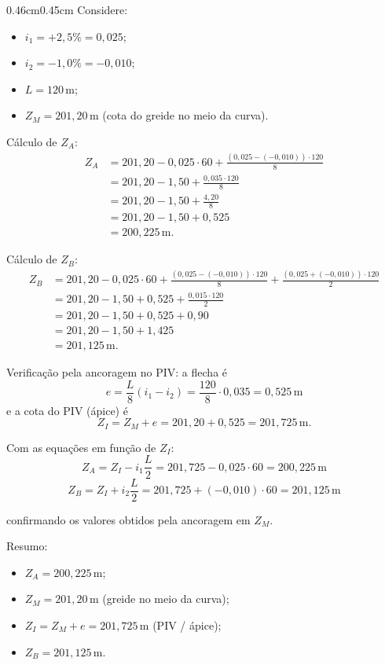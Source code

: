 \documentclass[12pt,letterpaper]{article}
\newenvironment{corpo}{\begin{adjustwidth}{0.46cm}{0.45cm}\justifying}{\end{adjustwidth}}
\begin{document}
\begin{corpo}
Considere:
\begin{itemize}
    \item $i_1=+2{,}5\%=0{,}025$;
    \item $i_2=-1{,}0\%=-0{,}010$;
    \item $L=120\,\text{m}$;
    \item $Z_M=201{,}20\,\text{m}$ (cota do greide no meio da curva).
\end{itemize}

Cálculo de $Z_A$:
\[
\begin{aligned}
Z_A
&=201{,}20-0{,}025\cdot 60+\frac{(0{,}025-(-0{,}010))\cdot 120}{8} \\
&=201{,}20-1{,}50+\frac{0{,}035\cdot 120}{8} \\
&=201{,}20-1{,}50+\frac{4{,}20}{8} \\
&=201{,}20-1{,}50+0{,}525 \\
&=200{,}225\,\text{m}.
\end{aligned}
\]

Cálculo de $Z_B$:
\[
\begin{aligned}
Z_B
&=201{,}20-0{,}025\cdot 60+\frac{(0{,}025-(-0{,}010))\cdot 120}{8}
  +\frac{(0{,}025+(-0{,}010))\cdot 120}{2} \\
&=201{,}20-1{,}50+0{,}525+\frac{0{,}015\cdot 120}{2} \\
&=201{,}20-1{,}50+0{,}525+0{,}90 \\
&=201{,}20-1{,}50+1{,}425 \\
&=201{,}125\,\text{m}.
\end{aligned}
\]

Verificação pela ancoragem no PIV: a flecha é
\[
 e=\frac{L}{8}(i_1-i_2)=\frac{120}{8}\cdot 0{,}035=0{,}525\,\text{m}
\]
e a cota do PIV (ápice) é
\[
 Z_I=Z_M+e=201{,}20+0{,}525=201{,}725\,\text{m}.
\]

Com as equações em função de $Z_I$:
\[
 Z_A=Z_I-i_1\frac{L}{2}=201{,}725-0{,}025\cdot 60=200{,}225\,\text{m}
\]
\[
 Z_B=Z_I+i_2\frac{L}{2}=201{,}725+(-0{,}010)\cdot 60=201{,}125\,\text{m}
\]

confirmando os valores obtidos pela ancoragem em $Z_M$.

Resumo:
\begin{itemize}
    \item $Z_A=200{,}225\,\text{m}$;
    \item $Z_M=201{,}20\,\text{m}$ (greide no meio da curva);
    \item $Z_I=Z_M+e=201{,}725\,\text{m}$ (PIV / ápice);
    \item $Z_B=201{,}125\,\text{m}$.
\end{itemize}
\end{corpo}
\end{document}
